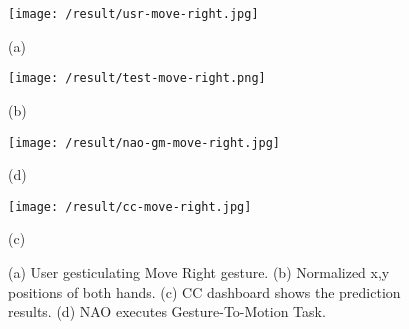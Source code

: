 \begin{figure}
	[h] 
	\begin{minipage}
		{0.3 
		\textwidth} 
		\texttt{[image: /result/usr-move-right.jpg]} \caption*{(a)} 
	\end{minipage}
	\begin{minipage}
		{0.7
			\textwidth} 
		\texttt{[image: /result/test-move-right.png]} \caption*{(b)} 
	\end{minipage}
	\begin{minipage}
		{0.3
		\textwidth}
		\texttt{[image: /result/nao-gm-move-right.jpg]} \caption*{(d)} 
	\end{minipage}
	\begin{minipage}
		{0.7
			\textwidth}
		\texttt{[image: /result/cc-move-right.jpg]}	\caption*{(c)} 
	\end{minipage}
	\caption{(a) User gesticulating Move Right gesture. (b) Normalized x,y positions of both hands. (c) CC dashboard shows the prediction results. (d) NAO executes Gesture-To-Motion Task.} \label{res:gm:move-right} 
\end{figure}
